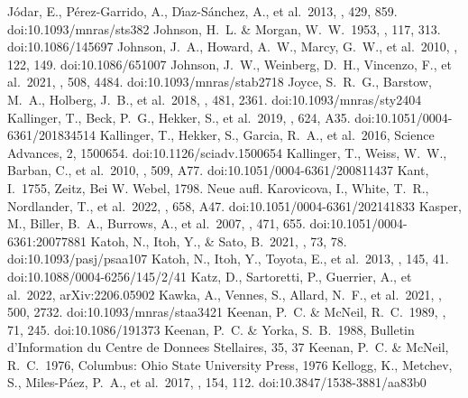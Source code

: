 \documentclass[twocolumn,tighten,twocolappendix]{aastex631}
\begin{document}
\begin{thebibliography}{}
 J{\'o}dar, E., P{\'e}rez-Garrido, A., D{\'\i}az-S{\'a}nchez, A., et al.\ 2013, \mnras, 429, 859. doi:10.1093/mnras/sts382
 Johnson, H.~L. \& Morgan, W.~W.\ 1953, \apj, 117, 313. doi:10.1086/145697
 Johnson, J.~A., Howard, A.~W., Marcy, G.~W., et al.\ 2010, \pasp, 122, 149. doi:10.1086/651007
 Johnson, J.~W., Weinberg, D.~H., Vincenzo, F., et al.\ 2021, \mnras, 508, 4484. doi:10.1093/mnras/stab2718
 Joyce, S.~R.~G., Barstow, M.~A., Holberg, J.~B., et al.\ 2018, \mnras, 481, 2361. doi:10.1093/mnras/sty2404
 Kallinger, T., Beck, P.~G., Hekker, S., et al.\ 2019, \aap, 624, A35. doi:10.1051/0004-6361/201834514
 Kallinger, T., Hekker, S., Garcia, R.~A., et al.\ 2016, Science Advances, 2, 1500654. doi:10.1126/sciadv.1500654
 Kallinger, T., Weiss, W.~W., Barban, C., et al.\ 2010, \aap, 509, A77. doi:10.1051/0004-6361/200811437
 Kant, I.\ 1755, Zeitz, Bei W. Webel, 1798. Neue aufl.
 Karovicova, I., White, T.~R., Nordlander, T., et al.\ 2022, \aap, 658, A47. doi:10.1051/0004-6361/202141833
 Kasper, M., Biller, B.~A., Burrows, A., et al.\ 2007, \aap, 471, 655. doi:10.1051/0004-6361:20077881
 Katoh, N., Itoh, Y., \& Sato, B.\ 2021, \pasj, 73, 78. doi:10.1093/pasj/psaa107
 Katoh, N., Itoh, Y., Toyota, E., et al.\ 2013, \aj, 145, 41. doi:10.1088/0004-6256/145/2/41
 Katz, D., Sartoretti, P., Guerrier, A., et al.\ 2022, arXiv:2206.05902
 Kawka, A., Vennes, S., Allard, N.~F., et al.\ 2021, \mnras, 500, 2732. doi:10.1093/mnras/staa3421
 Keenan, P.~C. \& McNeil, R.~C.\ 1989, \apjs, 71, 245. doi:10.1086/191373
 Keenan, P.~C. \& Yorka, S.~B.\ 1988, Bulletin d'Information du Centre de Donnees Stellaires, 35, 37
 Keenan, P.~C. \& McNeil, R.~C.\ 1976, Columbus: Ohio State University Press, 1976
 Kellogg, K., Metchev, S., Miles-P{\'a}ez, P.~A., et al.\ 2017, \aj, 154, 112. doi:10.3847/1538-3881/aa83b0

\end{thebibliography}
\end{document}
